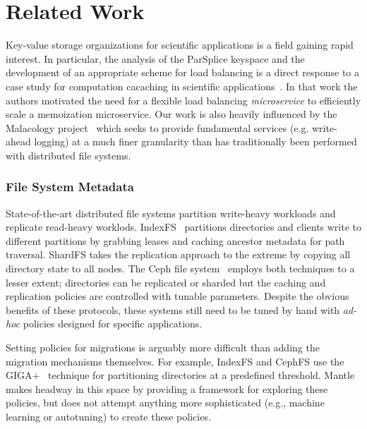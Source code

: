 \section{Related Work}

Key-value storage organizations for scientific applications is a field gaining
rapid interest. In particular, the analysis of the ParSplice keyspace and the
development of an appropriate scheme for load balancing is a direct response to
a case study for computation cacaching in scientific
applications~\cite{jenkins:ipdsw17-mochi}. In that work the authors motivated
the need for a flexible load balancing \emph{microservice} to efficiently scale
a memoization microservice. Our work is also heavily influenced by the
Malacology project~\cite{sevilla:eurosys17-malacology} which seeks to provide
fundamental services (e.g. write-ahead logging) at a much finer granularity
than has traditionally been performed with distributed file systems.  

\subsubsection*{File System Metadata}

State-of-the-art distributed file systems partition write-heavy workloads and
replicate read-heavy worklods.  IndexFS~\cite{ren:sc2014-indexfs} partitions
directories and clients write to different partitions by grabbing leases and
caching ancestor metadata for path traversal. ShardFS takes the replication
approach to the extreme by copying all directory state to all nodes. The Ceph
file system~\cite{weil:sc2004-dyn-metadata, weil:osdi2006-ceph} employs both
techniques to a lesser extent; directories can be replicated or sharded but the
caching and replication policies are controlled with tunable parameters.
Despite the obvious benefits of these protocols, these systems still need to be
tuned by hand with {\it ad-hoc} policies designed for specific applications. 

Setting policies for migrations is arguably more difficult than adding the
migration mechanisms themselves.  For example, IndexFS and CephFS use the
GIGA+~\cite{patil:fast2011-giga} technique for partitioning directories at a
predefined threshold. Mantle makes headway in this space by providing a
framework for exploring these policies, but does not attempt anything more
sophisticated (e.g., machine learning or autotuning) to create these policies. 

